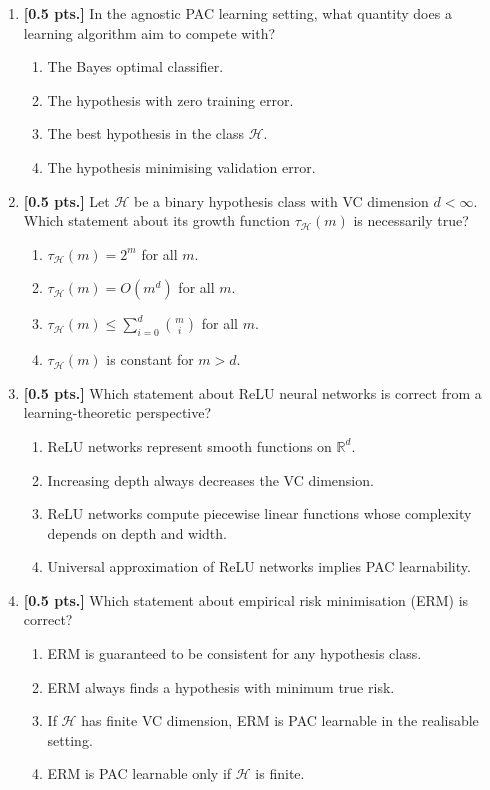 \documentclass[11pt,a4paper]{article}
\begin{document}
\begin{enumerate}[label=\textbf{MQ\arabic*.}]
    \item \textbf{[0.5 pts.]} In the agnostic PAC learning setting, what quantity does a learning algorithm aim to compete with?
    \begin{enumerate}[label=(\alph*)]
        \item The Bayes optimal classifier.
        \item The hypothesis with zero training error.
        \item The best hypothesis in the class $\mathcal{H}$.
        \item The hypothesis minimising validation error.
    \end{enumerate}

    \item \textbf{[0.5 pts.]} Let $\mathcal{H}$ be a binary hypothesis class with VC dimension $d < \infty$. Which statement about its growth function $\tau_{\mathcal{H}}(m)$ is necessarily true?
    \begin{enumerate}[label=(\alph*)]
        \item $\tau_{\mathcal{H}}(m) = 2^m$ for all $m$.
        \item $\tau_{\mathcal{H}}(m) = O(m^d)$ for all $m$.
        \item $\tau_{\mathcal{H}}(m) \le \sum_{i=0}^d \binom{m}{i}$ for all $m$.
        \item $\tau_{\mathcal{H}}(m)$ is constant for $m > d$.
    \end{enumerate}

    \item \textbf{[0.5 pts.]} Which statement about ReLU neural networks is correct from a learning-theoretic perspective?
    \begin{enumerate}[label=(\alph*)]
        \item ReLU networks represent smooth functions on $\mathbb{R}^d$.
        \item Increasing depth always decreases the VC dimension.
        \item ReLU networks compute piecewise linear functions whose complexity depends on depth and width.
        \item Universal approximation of ReLU networks implies PAC learnability.
    \end{enumerate}

    \item \textbf{[0.5 pts.]} Which statement about empirical risk minimisation (ERM) is correct?
    \begin{enumerate}[label=(\alph*)]
        \item ERM is guaranteed to be consistent for any hypothesis class.
        \item ERM always finds a hypothesis with minimum true risk.
        \item If $\mathcal{H}$ has finite VC dimension, ERM is PAC learnable in the realisable setting.
        \item ERM is PAC learnable only if $\mathcal{H}$ is finite.
    \end{enumerate}


\end{enumerate}
\end{document}
